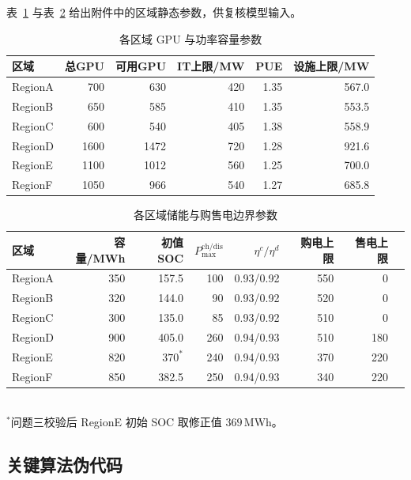 \documentclass[UTF8,a4paper,zihao=-4]{ctexart}
\begin{document}
表~\ref{tab:app-gpu} 与表~\ref{tab:app-storage} 给出附件中的区域静态参数，供复核模型输入。

\begin{table}[H]
\centering
\footnotesize
\caption{各区域 GPU 与功率容量参数}
\label{tab:app-gpu}
\setlength{\tabcolsep}{3.5pt}
\begin{tabular}{lrrrrr}
\toprule
区域 & 总GPU & 可用GPU & IT上限/MW & PUE & 设施上限/MW \\
\midrule
RegionA & 700 & 630 & 420 & 1.35 & 567.0 \\
RegionB & 650 & 585 & 410 & 1.35 & 553.5 \\
RegionC & 600 & 540 & 405 & 1.38 & 558.9 \\
RegionD & 1600 & 1472 & 720 & 1.28 & 921.6 \\
RegionE & 1100 & 1012 & 560 & 1.25 & 700.0 \\
RegionF & 1050 & 966 & 540 & 1.27 & 685.8 \\
\bottomrule
\end{tabular}
\end{table}

\begin{table}[H]
\centering
\footnotesize
\caption{各区域储能与购售电边界参数}
\label{tab:app-storage}
\setlength{\tabcolsep}{2.8pt}
\begin{tabular}{lrrrrrrr}
\toprule
区域 & 容量/MWh & 初值SOC & $P_{\max}^{\mathrm{ch/dis}}$ & $\eta^{c}/\eta^{d}$ & 购电上限 & 售电上限 \\
\midrule
RegionA & 350 & 157.5 & 100 & 0.93/0.92 & 550 & 0 \\
RegionB & 320 & 144.0 & 90 & 0.93/0.92 & 520 & 0 \\
RegionC & 300 & 135.0 & 85 & 0.93/0.92 & 510 & 0 \\
RegionD & 900 & 405.0 & 260 & 0.94/0.93 & 510 & 180 \\
RegionE & 820 & $370^{*}$ & 240 & 0.94/0.93 & 370 & 220 \\
RegionF & 850 & 382.5 & 250 & 0.94/0.93 & 340 & 220 \\
\bottomrule
\end{tabular}\\[0.3em]
{\footnotesize $^{*}$问题三校验后 RegionE 初始 SOC 取修正值 $369$\,MWh。}
\end{table}

\subsection{关键算法伪代码}
\end{document}
